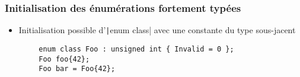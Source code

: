 \documentclass[C++.tex]{subfiles}
\begin{document}
\begin{frame}[fragile]
	\frametitle{Initialisation des énumérations fortement typées}
	\begin{itemize}
		\item Initialisation possible d'\texttt|enum class| avec une constante du type sous-jacent
	\end{itemize}

	\begin{verbatim}
		enum class Foo : unsigned int { Invalid = 0 };
		Foo foo{42};
		Foo bar = Foo{42};
	\end{verbatim}


\end{frame}
\end{document}
